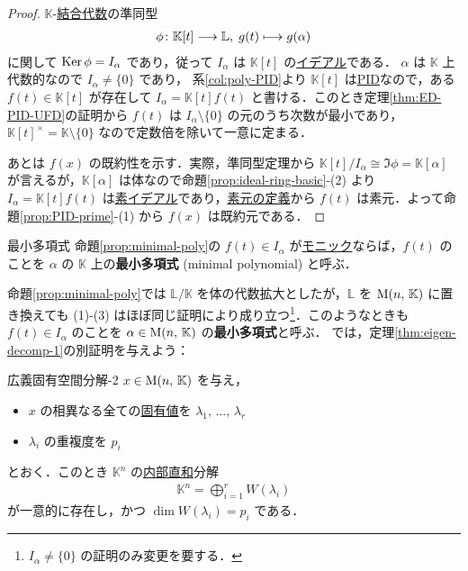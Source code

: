 \documentclass[rep_main]{subfiles}
\begin{document}
\begin{proof}
    $\mathbb{K}$-\hyperref[ax:Alg]{結合代数}の準同型
    \begin{align}
        \phi \colon \mathbb{K}[t] \longrightarrow \mathbb{L},\; g(t) \longmapsto g(\alpha)
    \end{align}
    に関して $\operatorname{Ker} \phi = I_\alpha$ であり，従って $I_\alpha$ は $\mathbb{K}[t]$ の\hyperref[def:ideal-ring]{イデアル}である．
    $\alpha$ は $\mathbb{K}$ 上代数的なので $I_\alpha \neq \{0\}$ であり，
    系\ref{col:poly-PID}より $\mathbb{K}[t]$ は\hyperref[def:domains]{PID}なので，ある $f(t) \in \mathbb{K}[t]$ が存在して $I_\alpha = \mathbb{K}[t] f(t)$ と書ける．このとき定理\ref{thm:ED-PID-UFD}の証明から $f(t)$ は $I_\alpha\setminus \{0\}$ の元のうち次数が最小であり，
    $\mathbb{K}[t]^\times = \mathbb{K} \setminus \{0\}$ なので定数倍を除いて一意に定まる．

    あとは $f(x)$ の既約性を示す．実際，準同型定理から $\mathbb{K}[t]/I_\alpha \cong \Im \phi = \mathbb{K}[\alpha]$ が言えるが，$\mathbb{K}[\alpha]$ は体なので命題\ref{prop:ideal-ring-basic}-(2) より $I_\alpha = \mathbb{K}[t] f(t)$ は\hyperref[def:ideal-ring]{素イデアル}であり，\hyperref[def:domain-basic]{素元の定義}から $f(t)$ は素元．よって命題\ref{prop:PID-prime}-(1) から $f(x)$ は既約元である．
\end{proof}

\begin{mydef}[label=def:minimal-poly]{最小多項式}
    命題\ref{prop:minimal-poly}の $f(t) \in I_\alpha$ が\hyperref[def:poly-basic]{モニック}ならば，$f(t)$ のことを $\alpha$ の $\mathbb{K}$ 上の\textbf{最小多項式} (minimal polynomial) と呼ぶ．
\end{mydef}

命題\ref{prop:minimal-poly}では $\mathbb{L}/\mathbb{K}$ を体の代数拡大としたが，$\mathbb{L}$ を $\mathrm{M}(n,\, \mathbb{K})$ に置き換えても (1)-(3) はほぼ同じ証明により成り立つ\footnote{$I_\alpha \neq \{0\}$ の証明のみ変更を要する．}．このようなときも $f(t) \in I_\alpha$ のことを $\alpha \in \mathrm{M}(n,\, \mathbb{K})$ の\textbf{最小多項式}と呼ぶ．
では，定理\ref{thm:eigen-decomp-1}の別証明を与えよう：

\begin{mytheo}[label=thm:eigen-decomp-2]{広義固有空間分解-2}
    $x \in \mathrm{M}(n,\, \mathbb{K})$ を与え，
    \begin{itemize}
        \item $x$ の相異なる全ての\hyperref[def:eigen]{固有値}を $\lambda_1,\, \dots,\, \lambda_r$
        \item $\lambda_i$ の重複度を $p_i$
    \end{itemize} 
    とおく．このとき $\mathbb{K}^n$ の\hyperref[prop:subvec-directsum]{内部直和}分解
    \begin{align}
        \mathbb{K}^n = \bigoplus_{i=1}^r W(\lambda_i)
    \end{align}
    が一意的に存在し，かつ $\dim W(\lambda_i) = p_i$ である．
\end{mytheo}
\end{document}
